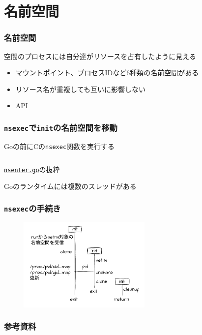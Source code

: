 \documentclass[unicode, 14pt, aspectratio=169]{beamer}
\begin{document}
\section{名前空間}
\begin{frame}[t]
  \frametitle{名前空間\supercite{namespaces}}
  空間のプロセスには自分達がリソースを占有したように見える
  \begin{itemize}[leftmargin=0.8cm,label=$\circ$]
    \item マウントポイント、プロセスIDなど6種類の名前空間がある
    \item リソース名が重複しても互いに影響しない
    \item API
    \end{itemize}
\end{frame}
\begin{frame}[t]
  \frametitle{\texttt{nsexec}で\texttt{init}の名前空間を移動}
  Goの前にCの\texttt{nsexec}関数を実行する
  \begin{center}
    \inputminted{go}{code/nsenter.go}
    \href{https://github.com/opencontainers/runc/blob/7cb363254b69e10320360b63fb73e0ffb5da7bf2/libcontainer/nsenter/nsenter.go\#L12}{\texttt{nsenter.go}}の抜粋
  \end{center}
  Goのランタイムには複数のスレッドがある
\end{frame}
\begin{frame}[t]
  \frametitle{\texttt{nsexec}の手続き}
  \begin{figure}
    \centering
    \includegraphics[width=6.5cm]{images/nsenter.drawio.pdf}
    \label{fig:nsenter}
  \end{figure}  
\end{frame}
\begin{frame}[allowframebreaks]
  \frametitle{参考資料}
  \printbibliography
  \nocite{*} 
\end{frame}
\end{document}
